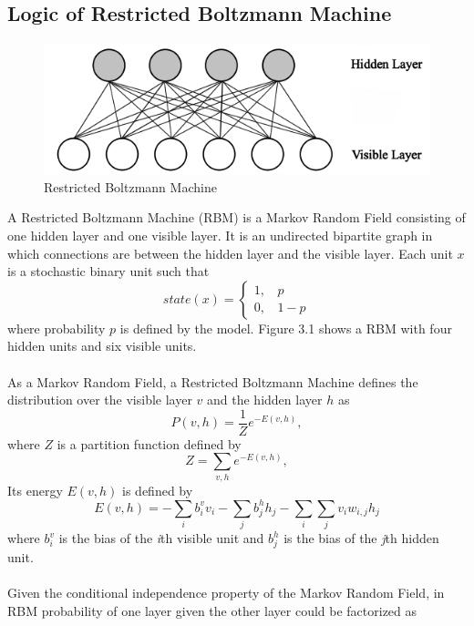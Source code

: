\documentclass[12pt]{article}
\begin{document}
\subsection{Logic of Restricted Boltzmann Machine}
\begin{figure}[h]
\centering
\includegraphics[height=1.5in]{RBM.png}
\caption{Restricted Boltzmann Machine} \label{fig:side:a}
\end{figure}
A Restricted Boltzmann Machine (RBM) is a Markov Random Field consisting of one hidden layer and one visible layer. It is an undirected bipartite graph in which connections are between the hidden layer and the visible layer. Each unit $x$ is a stochastic binary unit such that\begin{equation}
state(x)=\begin{cases}1,~~~~p\\
0,~~~~1-p
\end{cases}
\end{equation}
where probability $p$ is defined by the model. Figure 3.1 shows a RBM with four hidden units and six visible units.\\
\\
As a Markov Random Field, a Restricted Boltzmann Machine defines the  distribution over the visible layer $v$ and the hidden layer $h$ as \begin{equation}
P(v,h) = \frac{1}{Z} e^{-E(v,h)},\label{eq:3}
\end{equation}
where $Z$ is a partition function defined by \begin{equation}
Z = \sum_{v, h} e^{-E(v,h)},
\end{equation}
Its energy $E(v,h)$ is defined by \begin{equation}\label{eq:1}
E(v,h) = -\sum_i b^v_i v_i - \sum_j b^h_j h_j -\sum_i \sum_j v_i w_{i,j} h_j
\end{equation}
where $b^v_i$ is the bias of the \emph{i}th visible unit and $b^h_j$ is the bias of the \emph{j}th hidden unit.\\
\\
Given the conditional independence property of the Markov Random Field, in RBM probability of one layer given the other layer could be factorized as
\end{document}
